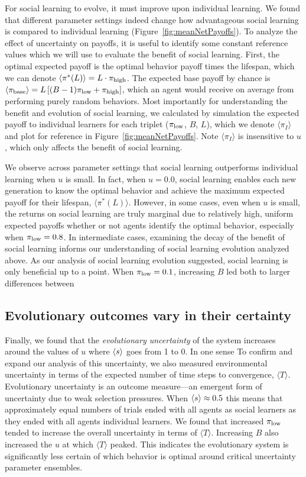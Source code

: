 \documentclass[letterpaper,11.5pt]{scrartcl}
\begin{document}
For social learning to evolve, it must improve upon individual learning. 
We found that different parameter settings indeed change how advantageous social learning
is compared to individual learning (Figure~\ref{fig:meanNetPayoffs}). 
To analyze the effect of uncertainty on
payoffs, it is useful to identify some constant reference values which we will
use to evaluate the benefit of social learning. First, the optimal expected payoff
is the optimal behavior payoff times the lifespan, which we can denote
$\langle \pi^*(L) \rangle = L\cdot\pi_{\mathrm{high}}$. The expected base payoff by chance is 
$\langle \pi_{\text{base}} \rangle = L \left[ (B - 1) \pi_{\mathrm{low}} + \pi_{\mathrm{high}} \right]$, which
an agent would receive on average from performing purely random behaviors. 
Most importantly for understanding the benefit and evolution of social learning,
we calculated by simulation the expected payoff to individual learners for
each triplet ($\pi_{\mathrm{low}}$, $B$, $L$), which we denote $\langle \pi_I \rangle$
and plot for reference in Figure~\ref{fig:meanNetPayoffs}. Note $\langle \pi_I
\rangle$ is insensitive to $u$, which only affects the benefit of social
learning.

We observe across parameter settings that social learning outperforms
individual learning when $u$ is small. In fact, when $u=0.0$, social learning 
enables each new generation to know the optimal behavior and achieve the maximum
expected payoff for their lifespan, $\langle \pi^*(L) \rangle$. 
However, in some cases, even when $u$ is small, 
the returns on social learning are truly marginal due to 
relatively high, uniform expected payoffs whether or not agents identify the optimal
behavior, especially when $\pi_{\mathrm{low}} = 0.8$. In intermediate cases, examining the decay
of the benefit of social learning informs our understanding of social learning
evolution analyzed above.  As our analysis of social learning evolution suggested,
social learning is only beneficial up to a point. When $\pi_{\mathrm{low}}=0.1$, increasing $B$
led both to larger differences between 

\subsection{Evolutionary outcomes vary in their certainty} 

Finally, we found that the \emph{evolutionary uncertainty} of the system increases
around the values of $u$ where $\langle s \rangle$ goes from 1 to 0. 
In one sense
To confirm and expand our analysis of this uncertainty, we 
also measured environmental uncertainty in terms of the
expected number of time steps to convergence, $\langle T \rangle$. Evolutionary
uncertainty is an outcome measure---an emergent form of uncertainty due to
weak selection pressures. When 
$\langle s \rangle \approx 0.5$ this means that approximately equal numbers of trials
ended with all agents as social learners as they ended with all agents 
individual learners. We found that increased $\pi_{\mathrm{low}}$
tended to increase the overall uncertainty in terms of $\langle T \rangle$.
Increasing $B$ also increased the $u$ at which $\langle T \rangle$ peaked.
This indicates the evolutionary system is significantly less certain of 
which behavior is optimal around critical uncertainty parameter ensembles.
\end{document}
